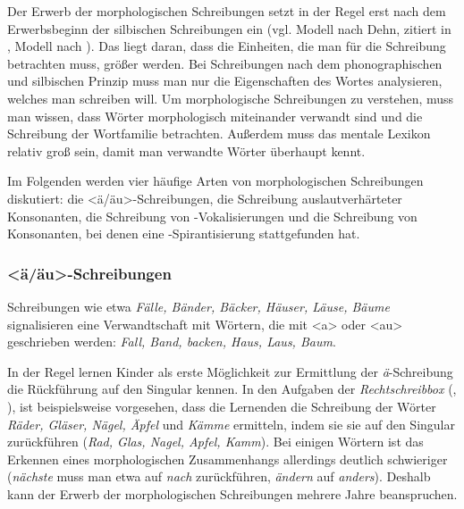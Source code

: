 Der Erwerb der morphologischen Schreibungen setzt in der Regel erst nach dem Erwerbsbeginn der silbischen Schreibungen ein (vgl. \zB Modell nach Dehn, zitiert in \cite[Abschnitt 2.4]{Thome1999}, Modell nach \cite{May2013}). Das liegt daran, dass die Einheiten, die man für die Schreibung betrachten muss, größer werden. Bei Schreibungen nach dem phonographischen und silbischen Prinzip muss man nur die Eigenschaften des Wortes analysieren, welches man schreiben will. Um morphologische Schreibungen zu verstehen, muss man wissen, dass Wörter morphologisch miteinander verwandt sind und die Schreibung der Wortfamilie betrachten. Außerdem muss das mentale Lexikon relativ groß sein, damit man verwandte Wörter überhaupt kennt. 

Im Folgenden werden vier häufige Arten von morphologischen Schreibungen diskutiert: die <ä/äu>-Schreibungen, die Schreibung auslautverhärteter Konsonanten, die Schreibung von -Vokalisierungen und die Schreibung von Konsonanten, bei denen eine -Spirantisierung stattgefunden hat.

\subsubsection{<ä/äu>-Schreibungen}\label{subsec:ääuSchreibungen}

Schreibungen wie etwa \textit{Fälle, Bänder, Bäcker, Häuser, Läuse, Bäume} signalisieren eine Verwandtschaft mit Wörtern, die mit <a> oder <au> geschrieben werden: \textit{Fall, Band, backen, Haus, Laus, Baum}. 
 
In der Regel lernen Kinder als erste Möglichkeit zur Ermittlung der \textit{ä}-Schreibung die Rückführung auf den Singular kennen. In den Aufgaben der \textit{Rechtschreibbox} (\cite[29/1]{Lessmann2009}, \cite{Lessmann2013}), ist beispielsweise vorgesehen, dass die Lernenden die Schreibung der Wörter \textit{Räder, Gläser, Nägel, Äpfel} und \textit{Kämme} ermitteln, indem sie sie auf den Singular zurückführen (\textit{Rad, Glas, Nagel, Apfel, Kamm}). Bei einigen Wörtern ist das Erkennen eines morphologischen Zusammenhangs allerdings deutlich schwieriger (\textit{nächste} muss man etwa auf \textit{nach} zurückführen, \textit{ändern} auf \textit{anders}). Deshalb kann der Erwerb der morphologischen Schreibungen mehrere Jahre beanspruchen.
 
